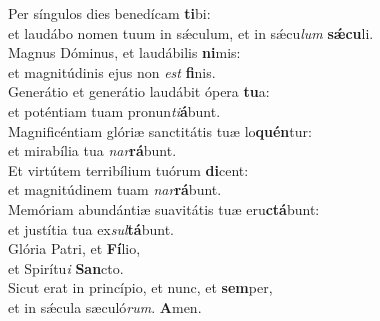 \evenverse Per síngulos dies benedícam \textbf{ti}bi:~\*\\
\evenverse et laudábo nomen tuum in sǽculum, et in sǽcu\textit{lum} \textbf{sǽ}\textbf{cu}li.\\
\oddverse Magnus Dóminus, et laudábilis \textbf{ni}mis:~\*\\
\oddverse et magnitúdinis ejus non \textit{est} \textbf{fi}nis.\\
\evenverse Generátio et generátio laudábit ópera \textbf{tu}a:~\*\\
\evenverse et poténtiam tuam pronun\textit{ti}\textbf{á}bunt.\\
\oddverse Magnificéntiam glóriæ sanctitátis tuæ lo\textbf{quén}tur:~\*\\
\oddverse et mirabília tua \textit{nar}\textbf{rá}bunt.\\
\evenverse Et virtútem terribílium tuórum \textbf{di}cent:~\*\\
\evenverse et magnitúdinem tuam \textit{nar}\textbf{rá}bunt.\\
\oddverse Memóriam abundántiæ suavitátis tuæ eru\textbf{ctá}bunt:~\*\\
\oddverse et justítia tua ex\textit{sul}\textbf{tá}bunt.\\
\evenverse Glória Patri, et \textbf{Fí}lio,~\*\\
\evenverse et Spirítu\textit{i} \textbf{San}cto.\\
\oddverse Sicut erat in princípio, et nunc, et \textbf{sem}per,~\*\\
\oddverse et in sǽcula sæculó\textit{rum}. \textbf{A}men.\\
